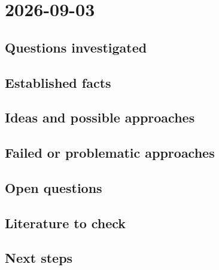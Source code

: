 \section*{2026-09-03}

\subsection*{Questions investigated}

\subsection*{Established facts}

\subsection*{Ideas and possible approaches}

\subsection*{Failed or problematic approaches}

\subsection*{Open questions}

\subsection*{Literature to check}

\subsection*{Next steps}

